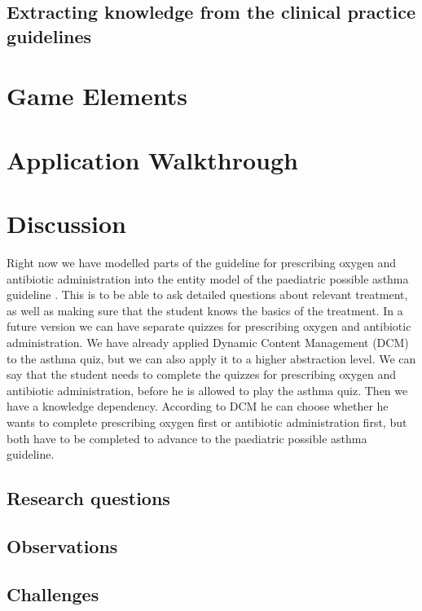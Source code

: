 \documentclass[a4paper,12pt]{book}
\begin{document}
\section{Extracting knowledge from the clinical  practice guidelines}



\chapter{Game Elements}


\chapter{Application Walkthrough}





\chapter{Discussion}
Right now we have modelled parts of the guideline for prescribing oxygen \parencite{RepublicofKeny2016} and antibiotic administration \parencite{RepublicofKeny2016} into the entity model of the paediatric possible asthma guideline \parencite{RepublicofKeny2016}. This is to be able to ask detailed questions about relevant treatment, as well as making sure that the student knows the basics of the treatment. In a future version we can have separate quizzes for prescribing oxygen and antibiotic administration. We have already applied Dynamic Content Management (DCM) to the asthma quiz, but we can also apply it to a higher abstraction level. We can say that the student needs to complete the quizzes for prescribing oxygen and antibiotic administration, before he is allowed to play the asthma quiz. Then we have a knowledge dependency. According to DCM he can choose whether he wants to complete prescribing oxygen first or antibiotic administration first, but both have to be completed to advance to the paediatric possible asthma guideline.

\section{Research questions}

\section{Observations}
\section{Challenges}
\end{document}
